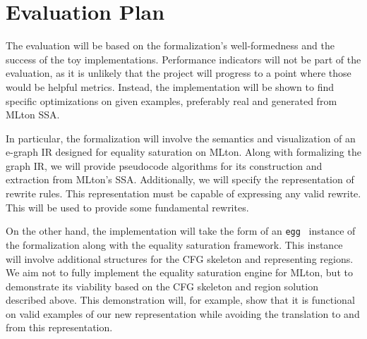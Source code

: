 \documentclass{article}
\begin{document}
\section{Evaluation Plan}

The evaluation will be based on the formalization's well-formedness and the success of the toy implementations. Performance indicators will not be part of the evaluation, as it is unlikely that the project will progress to a point where those would be helpful metrics. Instead, the implementation will be shown to find specific optimizations on given examples, preferably real and generated from MLton SSA.

In particular, the formalization will involve the semantics and visualization of an e-graph IR designed for equality saturation on MLton. Along with formalizing the graph IR, we will provide pseudocode algorithms for its construction and extraction from MLton's SSA. Additionally, we will specify the representation of rewrite rules. This representation must be capable of expressing any valid rewrite. This will be used to provide some fundamental rewrites. 

On the other hand, the implementation will take the form of an \verb|egg|~\cite{Willsey_2021} instance of the formalization along with the equality saturation framework. This instance will involve additional structures for the CFG skeleton and representing regions. We aim not to fully implement the equality saturation engine for MLton, but to demonstrate its viability based on the CFG skeleton and region solution described above. This demonstration will, for example, show that it is functional on valid examples of our new representation while avoiding the translation to and from this representation.





\end{document}
